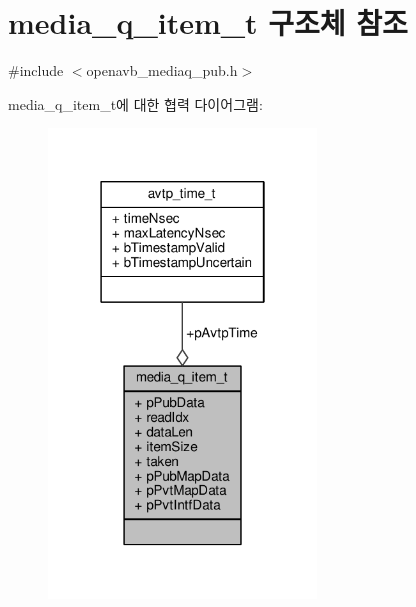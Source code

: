 \hypertarget{structmedia__q__item__t}{}\section{media\+\_\+q\+\_\+item\+\_\+t 구조체 참조}
\label{structmedia__q__item__t}


{\ttfamily \#include $<$openavb\+\_\+mediaq\+\_\+pub.\+h$>$}



media\+\_\+q\+\_\+item\+\_\+t에 대한 협력 다이어그램\+:
\nopagebreak
\begin{figure}[H]
\begin{center}
\leavevmode
\includegraphics[width=202pt]{structmedia__q__item__t__coll__graph}
\end{center}
\end{figure}
